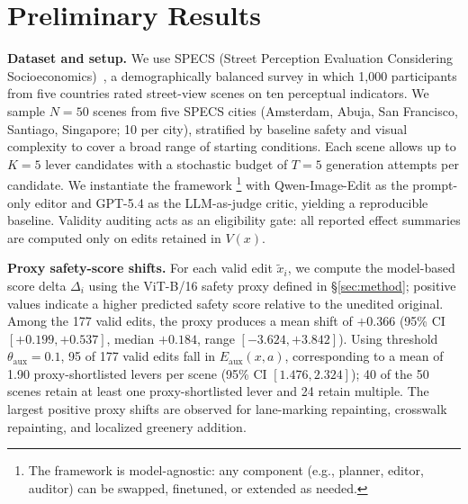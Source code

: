\section{Preliminary Results}
\label{sec:results}


\noindent\textbf{Dataset and setup.}
We use SPECS (Street Perception Evaluation Considering Socioeconomics)~\cite{quintana2025}, a demographically balanced survey in which 1{,}000 participants from five countries rated street-view scenes on ten perceptual indicators. We sample $N{=}50$ scenes from five SPECS cities (Amsterdam, Abuja, San Francisco, Santiago, Singapore; 10 per city), stratified by baseline safety and visual complexity to cover a broad range of starting conditions. Each scene allows up to $K{=}5$ lever candidates with a stochastic budget of $T{=}5$ generation attempts per candidate. We instantiate the framework \footnote{The framework is model-agnostic: any component (e.g., planner, editor, auditor) can be swapped, finetuned, or extended as needed.} with Qwen-Image-Edit as the prompt-only editor and GPT-5.4 as the LLM-as-judge critic, yielding a reproducible baseline. Validity auditing acts as an eligibility gate: all reported effect summaries are computed only on edits retained in $V(x)$.

\noindent\textbf{Proxy safety-score shifts.}
For each valid edit $\tilde{x}_i$, we compute the model-based score delta $\Delta_i$ using the ViT-B/16 safety proxy defined in \S\ref{sec:method}; positive values indicate a higher
predicted safety score relative to the unedited original. Among the 177 valid edits, the proxy produces a mean shift of $+0.366$ (95\% CI $[+0.199, +0.537]$, median $+0.184$, range
$[-3.624, +3.842]$). Using threshold $\theta_{\mathrm{aux}}{=}0.1$,
95 of 177 valid edits fall in $E_{\mathrm{aux}}(x,a)$, corresponding to
a mean of 1.90 proxy-shortlisted levers per scene
(95\% CI $[1.476, 2.324]$); 40 of the 50 scenes retain at least one
proxy-shortlisted lever and 24 retain multiple.
The largest positive proxy shifts are observed for
lane-marking repainting, crosswalk repainting, and localized greenery
addition.

